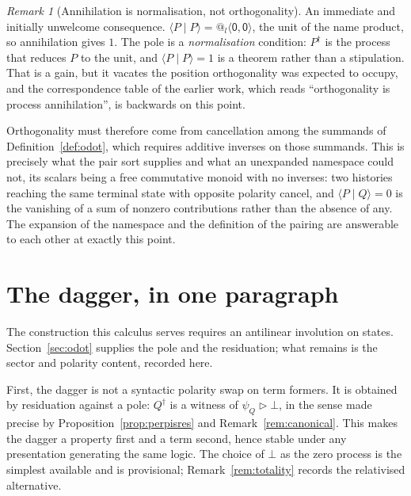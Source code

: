 \documentclass[11pt]{article}
\makeatletter
\theoremstyle{definition}
\theoremstyle{remark}
\newtheorem{remark}[theorem]{Remark}
\newcommand{\pzero}{\mathsf{0}}
\newcommand{\quo}[1]{\ensuremath{@_{#1}}}
\newcommand{\dip}[2]{\ensuremath{\langle #1 , #2 \rangle}}
\makeatother
\begin{document}
\begin{remark}[Annihilation is normalisation, not orthogonality]
\label{rem:normalisation}
An immediate and initially unwelcome consequence. $\langle P \mid P \rangle =
\quo{l}\dip{\pzero}{\pzero}$, the unit of the name product, so annihilation
gives $1$. The pole is a \emph{normalisation} condition: $P^{\dagger}$ is the
process that reduces $P$ to the unit, and $\langle P \mid P \rangle = 1$ is a
theorem rather than a stipulation. That is a gain, but it vacates the position
orthogonality was expected to occupy, and the correspondence table of the
earlier work, which reads ``orthogonality is process annihilation'', is
backwards on this point.

Orthogonality must therefore come from cancellation among the summands of
Definition~\ref{def:odot}, which requires additive inverses on those summands.
This is precisely what the pair sort supplies and what an unexpanded namespace
could not, its scalars being a free commutative monoid with no inverses: two
histories reaching the same terminal
state with opposite polarity cancel, and $\langle P \mid Q \rangle = 0$ is the
vanishing of a sum of nonzero contributions rather than the absence of any. The
expansion of the namespace and the definition of the pairing are answerable to
each other at exactly this point.
\end{remark}

\section{The dagger, in one paragraph}
\label{sec:dagger}

The construction this calculus serves requires an antilinear involution on
states. Section~\ref{sec:odot} supplies the pole and the residuation; what
remains is the sector and polarity content, recorded here.

First, the dagger is not a syntactic polarity swap on term formers. It is
obtained by residuation against a pole: $Q^\dagger$ is a witness of
$\psi_Q \rhd \bot$, in the sense made precise by
Proposition~\ref{prop:perpisres} and Remark~\ref{rem:canonical}. This makes the
dagger a property first and a term second, hence stable under any presentation
generating the same logic. The choice of $\bot$ as the zero process is the
simplest available and is provisional; Remark~\ref{rem:totality} records the
relativised alternative.
\end{document}
